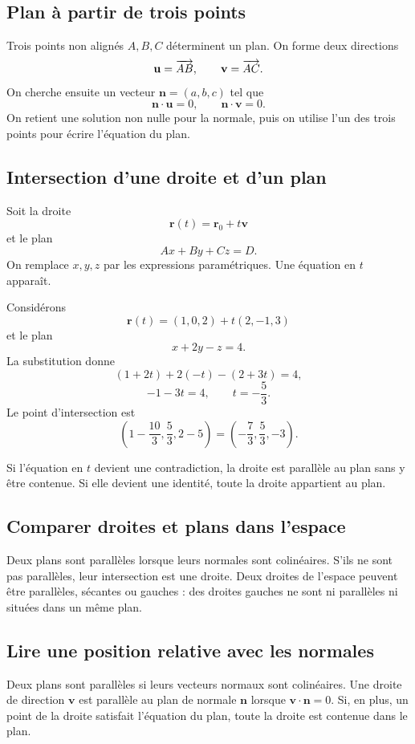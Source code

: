 \subsection{Plan à partir de trois points}

Trois points non alignés $A,B,C$ déterminent un plan. On forme deux directions
\[
\mathbf u=\overrightarrow{AB},
\qquad
\mathbf v=\overrightarrow{AC}.
\]
On cherche ensuite un vecteur $\mathbf n=(a,b,c)$ tel que
\[
\mathbf n\cdot\mathbf u=0,
\qquad
\mathbf n\cdot\mathbf v=0.
\]
On retient une solution non nulle pour la normale, puis on utilise l'un des trois points pour écrire l'équation du plan.

\subsection{Intersection d'une droite et d'un plan}

Soit la droite
\[
\mathbf r(t)=\mathbf r_0+t\mathbf v
\]
et le plan
\[
Ax+By+Cz=D.
\]
On remplace $x,y,z$ par les expressions paramétriques. Une équation en $t$ apparaît.

\begin{examplebox}
Considérons
\[
\mathbf r(t)=(1,0,2)+t(2,-1,3)
\]
et le plan
\[
x+2y-z=4.
\]
La substitution donne
\[
(1+2t)+2(-t)-(2+3t)=4,
\]
\[
-1-3t=4,
\qquad t=-\frac53.
\]
Le point d'intersection est
\[
\left(1-\frac{10}{3},\frac53,2-5\right)
=
\left(-\frac73,\frac53,-3\right).
\]
\end{examplebox}

Si l'équation en $t$ devient une contradiction, la droite est parallèle au plan sans y être contenue. Si elle devient une identité, toute la droite appartient au plan.

\subsection{Comparer droites et plans dans l'espace}

Deux plans sont parallèles lorsque leurs normales sont colinéaires. S'ils ne sont pas parallèles, leur intersection est une droite. Deux droites de l'espace peuvent être parallèles, sécantes ou gauches : des droites gauches ne sont ni parallèles ni situées dans un même plan.

\subsection{Lire une position relative avec les normales}

Deux plans sont parallèles si leurs vecteurs normaux sont colinéaires. Une droite de direction $\mathbf v$ est parallèle au plan de normale $\mathbf n$ lorsque $\mathbf v\cdot\mathbf n=0$. Si, en plus, un point de la droite satisfait l'équation du plan, toute la droite est contenue dans le plan.

